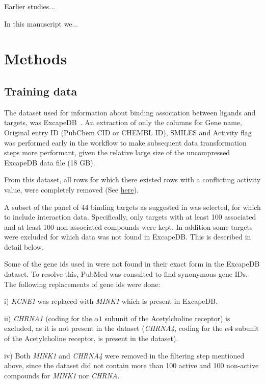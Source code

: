 \documentclass[utf8]{frontiersSCNS} %
\begin{document}
Earlier studies...


In this manuscript we...



\section{Methods}

\subsection{Training data}
The dataset used for information about binding association between ligands
and targets, was ExcapeDB~\cite{Sun2017}. An extraction of only the columns
for Gene name, Original entry ID (PubChem CID or CHEMBL ID), SMILES and
Activity flag was performed early in the workflow to make subsequent data
transformation steps more performant, given the relative large size of the
uncompressed ExcapeDB data file (18 GB).

From this dataset, all rows for which there existed rows with a conflicting
activity value, were completely removed (See \href{https://github.com/pharmbio/ptp-project/blob/c529cf/exp/20180426-wo-drugbank/wo_drugbank_wf.go#L239-L246}{here}).

A subset of the panel of 44 binding targets as suggested in \cite{Bowes2012}
was selected, for which to include interaction data. Specifically, only targets
with at least 100 associated and at least 100 non-associated compounds were
kept. In addition some targets were excluded for which data was not found in
ExcapeDB. This is described in detail below.

Some of the gene ids used in \cite{Bowes2012} were not found in their exact
form in the ExcapeDB dataset. To resolve this, PubMed was consulted to find
synonymous gene IDs. The following replacements of gene ids were done:

i) \textit{KCNE1} was replaced with \textit{MINK1} which is present in ExcapeDB.

ii) \textit{CHRNA1} (coding for the $\alpha1$ subunit of the Acetylcholine
receptor) is excluded, as it is not present in the dataset (\textit{CHRNA4},
coding for the $\alpha4$ subunit of the Acetylcholine receptor, is present in
the dataset).

iv) Both \textit{MINK1} and \textit{CHRNA4} were removed in the filtering
step mentioned above, since the dataset did not contain more than 100 active
and 100 non-active compounds for \textit{MINK1} nor \textit{CHRNA}.
\end{document}
